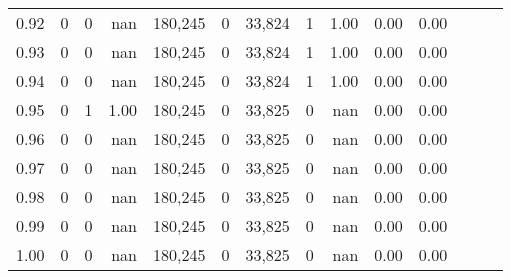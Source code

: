 \begin{tabular}{rrrrrrrrrrrrrr}
0.92 &      0 &    0 &   nan &  180,245 &        0 &  33,824 &       1 &  1.00 &  0.00 &      0.00 \\
0.93 &      0 &    0 &   nan &  180,245 &        0 &  33,824 &       1 &  1.00 &  0.00 &      0.00 \\
0.94 &      0 &    0 &   nan &  180,245 &        0 &  33,824 &       1 &  1.00 &  0.00 &      0.00 \\
0.95 &      0 &    1 &  1.00 &  180,245 &        0 &  33,825 &       0 &   nan &  0.00 &      0.00 \\
0.96 &      0 &    0 &   nan &  180,245 &        0 &  33,825 &       0 &   nan &  0.00 &      0.00 \\
0.97 &      0 &    0 &   nan &  180,245 &        0 &  33,825 &       0 &   nan &  0.00 &      0.00 \\
0.98 &      0 &    0 &   nan &  180,245 &        0 &  33,825 &       0 &   nan &  0.00 &      0.00 \\
0.99 &      0 &    0 &   nan &  180,245 &        0 &  33,825 &       0 &   nan &  0.00 &      0.00 \\
1.00 &      0 &    0 &   nan &  180,245 &        0 &  33,825 &       0 &   nan &  0.00 &      0.00 \\
\bottomrule
\end{tabular}
